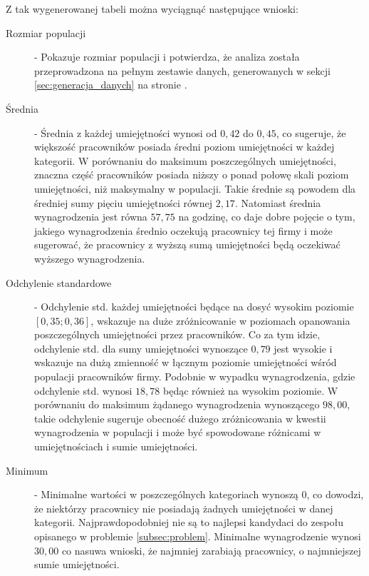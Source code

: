     \par Z tak wygenerowanej tabeli można wyciągnąć następujące wnioski:
    \begin{description}
        \item[Rozmiar populacji\label{itm:count}]  - Pokazuje rozmiar populacji i potwierdza, że analiza została przeprowadzona na pełnym zestawie danych, generowanych w sekcji \ref{sec:generacja_danych} na stronie \pageref{sec:generacja_danych}. 
        
        \item[Średnia\label{itm:mean}] - Średnia z każdej umiejętności wynosi od $0,42$ do $0,45$, co sugeruje, że większość pracowników posiada średni poziom umiejętności w każdej kategorii. W porównaniu do maksimum poszczególnych umiejętności, znaczna część pracowników posiada niższy o ponad połowę skali poziom umiejętności, niż maksymalny w populacji. Takie średnie są powodem dla średniej sumy pięciu umiejętności równej $2,17$. Natomiast średnia wynagrodzenia jest równa $57,75$ na godzinę, co daje dobre pojęcie o tym, jakiego wynagrodzenia średnio oczekują pracownicy tej firmy i może sugerować, że pracownicy z wyższą sumą umiejętności będą oczekiwać wyższego wynagrodzenia.
        
        \item[Odchylenie standardowe\label{itm:std}] - Odchylenie std. każdej umiejętności będące na dosyć wysokim poziomie $[0,35; 0,36]$, wskazuje na duże zróżnicowanie w poziomach opanowania poszczególnych umiejętności przez pracowników. Co za tym idzie, odchylenie std. dla sumy umiejętności wynoszące $0,79$ jest wysokie  i wskazuje na dużą zmienność w łącznym poziomie umiejętności wśród populacji pracowników firmy. Podobnie w wypadku wynagrodzenia, gdzie odchylenie std. wynosi $18,78$ będąc również na wysokim poziomie. W porównaniu do maksimum żądanego wynagrodzenia wynoszącego $98,00$, takie odchylenie sugeruje obecność dużego zróżnicowania w kwestii wynagrodzenia w populacji i może być spowodowane różnicami w umiejętnościach i sumie umiejętności.
        
        \item[Minimum\label{itm:min}] - Minimalne wartości w poszczególnych kategoriach wynoszą $0$, co dowodzi, że niektórzy pracownicy nie posiadają żadnych umiejętności w danej kategorii. Najprawdopodobniej nie są to najlepsi kandydaci do zespołu opisanego w problemie \ref{subsec:problem}. Minimalne wynagrodzenie wynosi $30,00$ co nasuwa wnioski, że najmniej zarabiają pracownicy, o najmniejszej sumie umiejętności.
        

\end{description}
